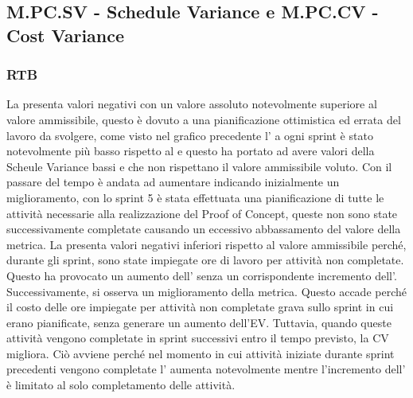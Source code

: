 \subsection{M.PC.SV - Schedule Variance e M.PC.CV - Cost Variance}

\subsubsection{RTB}
La  presenta valori negativi con un valore assoluto notevolmente superiore al valore ammissibile, questo è dovuto a una pianificazione
ottimistica ed errata del lavoro da svolgere, come visto nel grafico precedente l' a ogni sprint è stato notevolmente più basso rispetto al 
e questo ha portato ad avere valori della Scheule Variance bassi e che non rispettano il valore ammissibile voluto.
Con il passare del tempo è andata ad aumentare indicando inizialmente un miglioramento, con lo sprint 5 è stata effettuata una pianificazione di tutte le attività
necessarie alla realizzazione del Proof of Concept, queste non sono state successivamente completate causando un eccessivo abbassamento del valore della metrica.
La  presenta valori negativi inferiori rispetto al valore ammissibile perché, durante gli sprint, sono state impiegate ore di lavoro per attività non completate. 
Questo ha provocato un aumento dell' senza un corrispondente incremento dell'.
Successivamente, si osserva un miglioramento della metrica. Questo accade perché il costo delle ore impiegate per attività non completate grava sullo sprint in cui erano pianificate, 
senza generare un aumento dell'EV. Tuttavia, quando queste attività vengono completate in sprint successivi entro il tempo previsto, la CV migliora.
Ciò avviene perché nel momento in cui attività iniziate durante sprint precedenti vengono completate l' aumenta notevolmente mentre l'incremento dell' è limitato al solo completamento delle attività.
